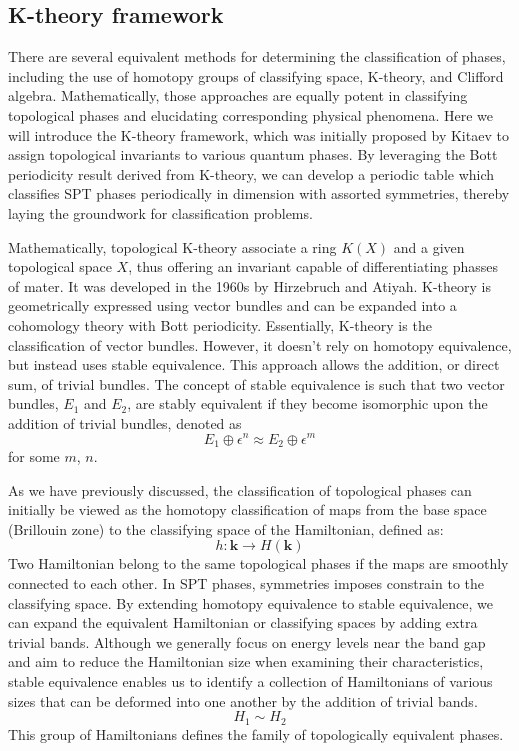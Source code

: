 \subsection{K-theory framework}
There are several equivalent methods for determining the classification of phases, including the use of homotopy groups of classifying space, K-theory, and Clifford algebra.  Mathematically, those approaches are equally potent in classifying topological phases and elucidating corresponding physical phenomena.
Here we will introduce the K-theory framework, which was initially proposed by Kitaev to assign topological invariants to various quantum phases. By leveraging the Bott periodicity\cite{atiyah1964clifford} result derived from K-theory, we can develop a periodic table which classifies SPT phases periodically in dimension with assorted symmetries, thereby laying the groundwork for classification problems.

Mathematically, topological K-theory associate a ring $K(X)$ and a given topological space $X$, thus offering an invariant capable of differentiating phasses of mater. It was developed in the 1960s by Hirzebruch and Atiyah\cite{atiyah1967K}. K-theory is geometrically expressed using vector bundles and can be expanded into a cohomology theory with Bott periodicity. Essentially, K-theory is the classification of vector bundles. However, it doesn't rely on homotopy equivalence, but instead uses stable equivalence. This approach allows the addition, or direct sum, of trivial bundles. The concept of stable equivalence is such that two vector bundles, $E_1$ and $E_2$, are stably equivalent if they become isomorphic upon the addition of trivial bundles, denoted as 
\begin{equation}
    E_1\oplus \epsilon^n \approx E_2\oplus \epsilon^m
\end{equation} for some $m$, $n$.

As we have previously discussed, the classification of topological phases can initially be viewed as the homotopy classification of maps from the base space (Brillouin zone) to the classifying space of the Hamiltonian, defined as:
\begin{equation}
    h:\mathbf{k}\rightarrow H(\mathbf{k})
\end{equation}
Two Hamiltonian belong to the same topological phases if the maps are smoothly connected to each other. In SPT phases, symmetries imposes constrain to the classifying space. By extending homotopy equivalence to stable equivalence, we can expand the equivalent Hamiltonian or classifying spaces by adding extra trivial bands. Although we generally focus on energy levels near the band gap and aim to reduce the Hamiltonian size when examining their characteristics, stable equivalence enables us to identify a collection of Hamiltonians of various sizes that can be deformed into one another by the addition of trivial bands.
\begin{equation}
    H_1\sim H_2
\end{equation}This group of Hamiltonians defines the family of topologically equivalent phases.

